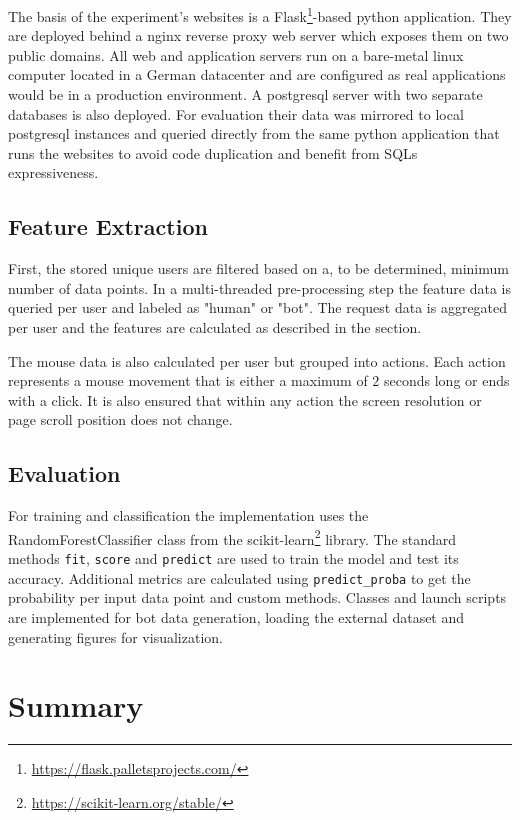 \documentclass[
    fontsize=12pt,
    headings=small,
    parskip=half,           %
    bibliography=totoc,
    numbers=noenddot,       %
    open=any,               %
    final,                   %
    table
]{scrreprt}
\begin{document}
The basis of the experiment's websites is a Flask\footnote{\url{https://flask.palletsprojects.com/}}-based python application. They are deployed behind a nginx reverse proxy web server which exposes them on two public domains. All web and application servers run on a bare-metal linux computer located in a German datacenter and are configured as real applications would be in a production environment. A postgresql server with two separate databases is also deployed. For evaluation their data was mirrored to local postgresql instances and queried directly from the same python application that runs the websites to avoid code duplication and benefit from SQLs expressiveness.

\subsection{Feature Extraction}

First, the stored unique users are filtered based on a, to be determined, minimum number of data points. In a multi-threaded pre-processing step the feature data is queried per user and labeled as "human" or "bot". The request data is aggregated per user and the features are calculated as described in the  section.

The mouse data is also calculated per user but grouped into actions. Each action represents a mouse movement that is either a maximum of $2$ seconds long or ends with a click. It is also ensured that within any action the screen resolution or page scroll position does not change.

\subsection{Evaluation}

For training and classification the implementation uses the RandomForestClassifier class from the scikit-learn\footnote{\url{https://scikit-learn.org/stable/}} library. The standard methods \lstinline{fit}, \lstinline{score} and \lstinline{predict} are used to train the model and test its accuracy. Additional metrics are calculated using \lstinline{predict_proba} to get the probability per input data point and custom methods. Classes and launch scripts are implemented for bot data generation, loading the external dataset and generating figures for visualization.


\section{Summary}
\end{document}
